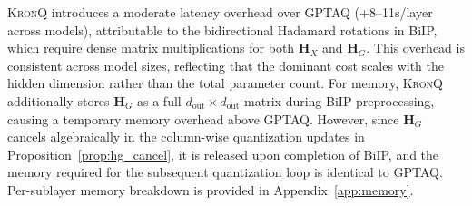 \documentclass{article} %
\newcommand{\KronQ}{\textsc{KronQ}}
\begin{document}
\begin{figure}
  \centering
  \vspace{-4mm}
  \begin{minipage}{0.95\linewidth}
    \centering
    \vspace{-1.5mm}
    \label{tab:calib_efficiency}
  \end{minipage}
  \vspace{-4mm}
\end{figure}
\KronQ{} introduces a moderate latency overhead over GPTAQ (+8--11s/layer across models), attributable to the bidirectional Hadamard rotations in BiIP, which require dense matrix multiplications for both $\mathbf{H}_X$ and $\mathbf{H}_G$. This overhead is consistent across model sizes, reflecting that the dominant cost scales with the hidden dimension rather than the total parameter count. For memory, \KronQ{} additionally stores $\mathbf{H}_G$ as a full $d_\text{out} \times d_\text{out}$ matrix during BiIP preprocessing, causing a temporary memory overhead above GPTAQ. However, since $\mathbf{H}_G$ cancels algebraically in the column-wise quantization updates in Proposition~\ref{prop:hg_cancel}, it is released upon completion of BiIP, and the memory required for the subsequent quantization loop is identical to GPTAQ. Per-sublayer memory breakdown is provided in Appendix~\ref{app:memory}.
\end{document}
